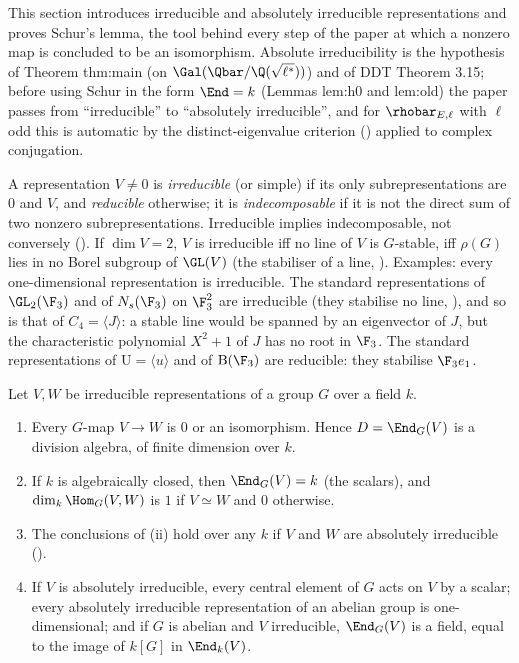 This section introduces irreducible and absolutely irreducible representations and proves Schur's lemma, the tool behind
every step of the paper at which a nonzero map is concluded to be an isomorphism. Absolute irreducibility is the hypothesis of Theorem thm:main (on
$\Gal(\Qbar/\Q(\sqrt{\ell^*}))$) and of DDT Theorem 3.15; before using Schur in the form $\End=k$ (Lemmas lem:h0 and lem:old) the paper
passes from ``irreducible'' to ``absolutely irreducible'', and for $\rhobar_{E,\ell}$ with $\ell$ odd this is automatic by the
distinct-eigenvalue criterion () applied to complex conjugation.

\begin{definition}\label{def:reps:irreducible}
A representation $V\ne0$ is \emph{irreducible} (or simple) if its only subrepresentations are $0$ and $V$, and \emph{reducible}
otherwise; it is \emph{indecomposable} if it is not the direct sum of two nonzero subrepresentations. Irreducible implies
indecomposable, not conversely (). If $\dim V=2$, $V$ is irreducible iff no line of $V$ is $G$-stable, iff $\rho(G)$
lies in no Borel subgroup of $\GL(V)$ (the stabiliser of a line, ).
Examples: every one-dimensional representation is irreducible. The standard representations of $\GL_2(\F_3)$ and of $N_s(\F_3)$ on $\F_3^2$
are irreducible (they stabilise no line, ), and so is that of $C_4=\langle J\rangle$: a stable line would be spanned by an
eigenvector of $J$, but the characteristic polynomial $X^2+1$ of $J$ has no root in $\F_3$. The standard representations of
$\mathrm U=\langle u\rangle$ and of $\mathrm B(\F_3)$ are reducible: they stabilise $\F_3e_1$.
\end{definition}

\begin{theorem}\label{thm:reps:schur}
Let $V,W$ be irreducible representations of a group $G$ over a field $k$.
\begin{enumerate}[label=(\roman*)]
\item Every $G$-map $V\to W$ is $0$ or an isomorphism. Hence $D=\End_G(V)$ is a division algebra, of finite dimension over $k$.
\item If $k$ is algebraically closed, then $\End_G(V)=k$ (the scalars), and $\dim_k\Hom_G(V,W)$ is $1$ if $V\simeq W$ and $0$ otherwise.
\item The conclusions of (ii) hold over any $k$ if $V$ and $W$ are absolutely irreducible ().
\item If $V$ is absolutely irreducible, every central element of $G$ acts on $V$ by a scalar; every absolutely irreducible
representation of an abelian group is one-dimensional; and if $G$ is abelian and $V$ irreducible, $\End_G(V)$ is a field, equal
to the image of $k[G]$ in $\End_k(V)$.
\end{enumerate}
\end{theorem}


